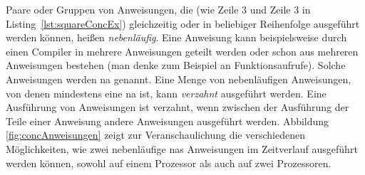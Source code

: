 Paare oder Gruppen von Anweisungen, die (wie Zeile 3 und Zeile 3 in Listing~\ref{lst:squareConcEx}) gleichzeitig oder in beliebiger Reihenfolge ausgeführt werden können, heißen \emph{nebenläufig}. Eine Anweisung kann beispielsweise durch einen Compiler in mehrere Anweisungen geteilt werden oder schon aus mehreren Anweisungen bestehen (man denke zum Beispiel an Funktionsaufrufe). Solche Anweisungen werden \gls{na} genannt. Eine Menge von nebenläufigen Anweisungen, von denen mindestens eine \gls{na} ist, kann \emph{verzahnt} ausgeführt werden. Eine Ausführung von Anweisungen ist verzahnt, wenn zwischen der Ausführung der Teile einer  Anweisung andere Anweisungen ausgeführt werden. Abbildung \ref{fig:concAnweisungen} zeigt zur Veranschaulichung die verschiedenen Möglichkeiten, wie zwei nebenläufige \glspl{na} Anweisungen im Zeitverlauf ausgeführt werden können, sowohl auf einem Prozessor als auch auf zwei Prozessoren. 
